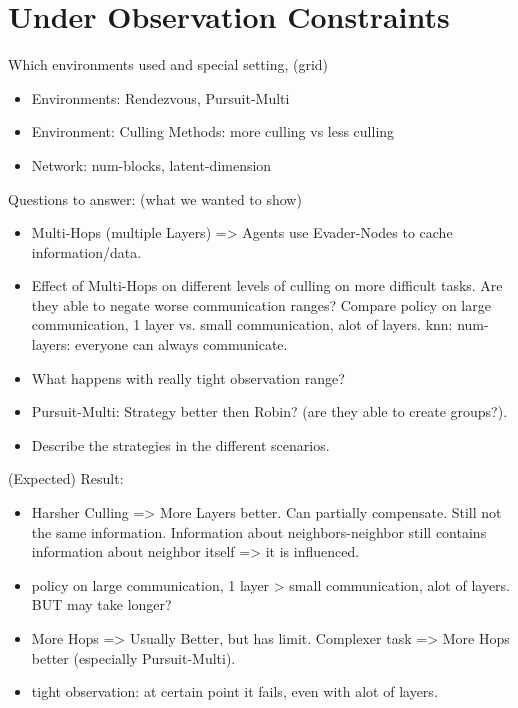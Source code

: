 \section{Under Observation Constraints}
\label{sec:Under Observation Constraints}
Which environments used and special setting, (grid)
\begin{itemize}[noitemsep,nolistsep]
    \item Environments: Rendezvous, Pursuit-Multi
    \item Environment: Culling Methods: more culling vs less culling
    \item Network: num-blocks, latent-dimension
\end{itemize}
Questions to answer:  (what we wanted to show)
\begin{itemize}[noitemsep,nolistsep]
    \item Multi-Hops (multiple Layers) => Agents use Evader-Nodes to cache information/data.
    \item Effect of Multi-Hops on different levels of culling on more difficult tasks. Are they able to negate worse communication ranges? Compare policy on large communication, 1 layer vs. small communication, alot of layers. knn: num-layers: everyone can always communicate.
    \item What happens with really tight observation range?
    \item Pursuit-Multi: Strategy better then Robin? (are they able to create groups?).
    \item Describe the strategies in the different scenarios.
\end{itemize}
(Expected) Result:
\begin{itemize}[noitemsep,nolistsep]
    \item Harsher Culling => More Layers better. Can partially compensate. Still not the same information. Information about neighbors-neighbor still contains information about neighbor itself => it is influenced.
    \item policy on large communication, 1 layer > small communication, alot of layers. BUT may take longer?
    \item More Hops => Usually Better, but has limit. Complexer task => More Hops better (especially Pursuit-Multi).
    \item tight observation: at certain point it fails, even with alot of layers.
\end{itemize}



